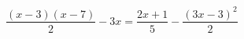 \begin{ex}
	\begin{condition}
		\( \dfrac{(x-3)(x-7)}{2}-3x=\dfrac{2x+1}{5}-\dfrac{(3x-3)^2}{2} \)
	\end{condition}
\end{ex}